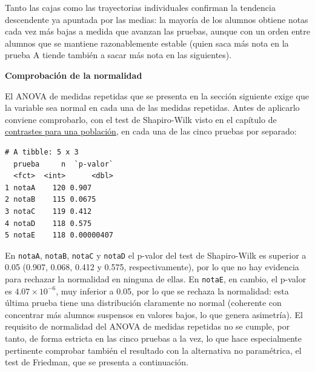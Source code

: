 \documentclass[
  spanish,
  a4paper,
]{scrreport}
\newenvironment{Shaded}{\begin{snugshade}}{\end{snugshade}}
\newcommand{\AttributeTok}[1]{\textcolor[rgb]{0.40,0.45,0.13}{#1}}
\newcommand{\FunctionTok}[1]{\textcolor[rgb]{0.28,0.35,0.67}{#1}}
\newcommand{\NormalTok}[1]{\textcolor[rgb]{0.00,0.23,0.31}{#1}}
\newcommand{\OtherTok}[1]{\textcolor[rgb]{0.00,0.23,0.31}{#1}}
\newcommand{\SpecialCharTok}[1]{\textcolor[rgb]{0.37,0.37,0.37}{#1}}
\newcommand{\StringTok}[1]{\textcolor[rgb]{0.13,0.47,0.30}{#1}}
\theoremstyle{definition}
\theoremstyle{definition}
\theoremstyle{remark}
\begin{document}
Tanto las cajas como las trayectorias individuales confirman la
tendencia descendente ya apuntada por las medias: la mayoría de los
alumnos obtiene notas cada vez más bajas a medida que avanzan las
pruebas, aunque con un orden entre alumnos que se mantiene
razonablemente estable (quien saca más nota en la prueba A tiende
también a sacar más nota en las siguientes).

\textbf{Comprobación de la normalidad}

El ANOVA de medidas repetidas que se presenta en la sección siguiente
exige que la variable sea normal en cada una de las medidas repetidas.
Antes de aplicarlo conviene comprobarlo, con el test de Shapiro-Wilk
visto en el capítulo de
\hyperref[contrastes-para-una-poblaciuxf3n]{contrastes para una
población}, en cada una de las cinco pruebas por separado:

\begin{Shaded}
\end{Shaded}

\begin{verbatim}
# A tibble: 5 x 3
  prueba     n  `p-valor`
  <fct>  <int>      <dbl>
1 notaA    120 0.907     
2 notaB    115 0.0675    
3 notaC    119 0.412     
4 notaD    118 0.575     
5 notaE    118 0.00000407
\end{verbatim}

En \texttt{notaA}, \texttt{notaB}, \texttt{notaC} y \texttt{notaD} el
p-valor del test de Shapiro-Wilk es superior a 0.05 (0.907, 0.068, 0.412
y 0.575, respectivamente), por lo que no hay evidencia para rechazar la
normalidad en ninguna de ellas. En \texttt{notaE}, en cambio, el p-valor
es \(4.07\times10^{-6}\), muy inferior a 0.05, por lo que se rechaza la
normalidad: esta última prueba tiene una distribución claramente no
normal (coherente con concentrar más alumnos suspensos en valores bajos,
lo que genera asimetría). El requisito de normalidad del ANOVA de
medidas repetidas no se cumple, por tanto, de forma estricta en las
cinco pruebas a la vez, lo que hace especialmente pertinente comprobar
también el resultado con la alternativa no paramétrica, el test de
Friedman, que se presenta a continuación.
\end{document}
